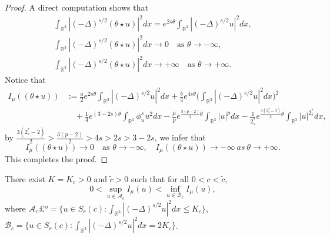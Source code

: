 \documentclass[reqno]{amsart}
\begin{document}
\begin{proof}
 A direct computation shows that
 \begin{gather*} %
\int_{\mathbb{R}^3}|(-\Delta)^{s/2}(\theta \star u)|^2dx=e^{2s\theta}
\int_{\mathbb{R}^3}|(-\Delta)^{s/2}u|^2dx, \\
\label{5.4}
\int_{\mathbb{R}^3}|(-\Delta)^{s/2}(\theta \star u)|^2dx\to 0\quad
\text{as }\theta \to -\infty, \\
\label{5.41}
\int_{\mathbb{R}^3}|(-\Delta)^{s/2}(\theta \star u)|^2dx\to +\infty\quad
\text{as }\theta \to +\infty.
\end{gather*}
Notice that
\begin{align*}%
I_\mu((\theta \star u))
&:= \frac{a}{2}e^{2s\theta}\int_{\mathbb{R}^3}|(-\Delta)^{s/2}u|^2dx
+\frac{b}{4}e^{4s\theta}\Big(\int_{\mathbb{R}^3}|(-\Delta)^{s/2}u|^2dx\Big)^2\\
&\quad +\frac{1}{4}e^{(3-2s)\theta}\int_{\mathbb{R}^3}\phi^s_u u^2dx
 -\frac{\mu}{p}e^{\frac{3(p-2)}{2}\theta}\int_{\mathbb{R}^3}|u|^pdx
 -\frac{1}{2^*_s}e^{\frac{3(2^*_s-2)}{2}\theta}\int_{\mathbb{R}^3}|u|^{2^*_s}dx,
\end{align*}
by $\frac{3(2^*_s-2)}{2}>\frac{3(p-2)}{2}>4s>2s>3-2s$, we infer that
$$
 I_\mu((\theta \star u))\to 0 \quad\text{as }\theta \to -\infty,
 \quad I_\mu((\theta \star u))\to -\infty ~as ~\theta \to +\infty.
$$
This completes the proof.
\end{proof}

\begin{lemma}\label{lem5.2} 
There exist $K=K_c>0$ and $\tilde{c}>0$ such that for all $0<c<\tilde{c}$,
\begin{equation}\label{5.3}
0<\sup_{u\in\mathcal{A}_c}I_\mu(u)<\inf_{u\in\mathcal{B}_c}I_\mu(u),
\end{equation}
where $\mathcal{A}_c£º=\{u\in  S_{r}(c):\int_{\mathbb{R}^3}|
(-\Delta)^{s/2}u|^2dx\leq K_c\}$, 
$\mathcal{B}_c=\{u\in S_{r}(c):\int_{\mathbb{R}^3}|(-\Delta)^{s/2}u|^2dx=2 K_c\}$.
\end{lemma}
\end{document}

